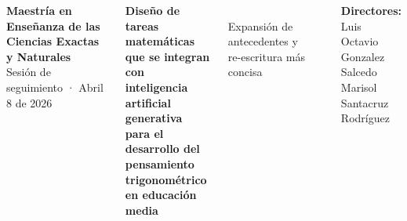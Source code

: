 \documentclass[11pt, aspectratio=169, spanish]{beamer}
\newcommand{\kwT}[1]{{\setlength{\fboxsep}{1.8pt}\colorbox{AzulInfo!18}{#1}}}
\newcommand{\kwM}[1]{{\setlength{\fboxsep}{1.8pt}\colorbox{VerdeUNAL!18}{#1}}}
\newcommand{\kwI}[1]{{\setlength{\fboxsep}{1.8pt}\colorbox{MoradoMarco!18}{#1}}}
\newcommand{\kwE}[1]{{\setlength{\fboxsep}{1.8pt}\colorbox{AmarilloAv!24}{#1}}}
\begin{document}
{
\begin{frame}[plain, shrink=5]
\vspace{0.04cm}
\begin{columns}[T]

\begin{center}
{\scriptsize\textbf{\textcolor{VerdeUNAL}{Maestría en Enseñanza de las Ciencias Exactas y Naturales}}}\\[0.04cm]
{\tiny\textcolor{VerdeUNAL}{Sesión de seguimiento · Abril 8 de 2026}}
\end{center}

\vspace{0.15cm}

\begin{tcolorbox}[colback=VerdeUNAL!5, colframe=VerdeUNAL!80, boxrule=1.2pt, arc=3mm]
\begin{center}
{\large\textbf{\kwT{Diseño de tareas matemáticas que se integran con}}}\\[0.04cm]
{\large\textbf{\kwI{inteligencia artificial generativa}}}\\[0.04cm]
{\small\textbf{para el desarrollo del \kwM{pensamiento trigonométrico}}}\\[0.02cm]
{\small\textbf{en \kwE{educación media}}}
\end{center}
\end{tcolorbox}

\vspace{0.15cm}

\begin{tcolorbox}[colback=VerdeOk!7, colframe=VerdeOk!65, arc=2mm, boxrule=0.8pt]
\\[0.05cm]
{\footnotesize Expansión de antecedentes y re-escritura más concisa}
\end{tcolorbox}

\vspace{0.1cm}
\begin{alertblock}{}
\end{alertblock}

\vspace{0.2cm}
\begin{tcolorbox}[colback=VerdeUNAL!8, colframe=VerdeUNAL!90, boxrule=1.2pt, arc=3mm,
  title={\centering\footnotesize\textbf{\faUsers\quad Información académica}}]
{\footnotesize
\textbf{Directores:}\\[-0.02cm]
{\scriptsize\faUser\; Luis Octavio Gonzalez Salcedo }\\
{\scriptsize\faUser\; Marisol Santacruz Rodríguez}}


\end{tcolorbox}
\end{columns}
\end{frame}}
\end{document}
